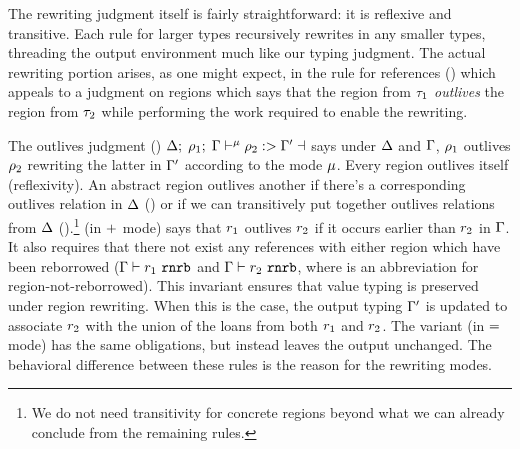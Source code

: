 The rewriting judgment itself is fairly straightforward: it is reflexive and
transitive. Each rule for larger types recursively rewrites in any smaller
types, threading the output environment much like our typing judgment. The
actual rewriting portion arises, as one might expect, in the rule for references
() which appeals to a judgment on regions which says that
the region from $\tau_1$ \emph{outlives} the region from $\tau_2$ while
performing the work required to enable the rewriting.

The outlives judgment ()
$\oxrunify{\oxtvarctx}{\oxvarctx}{\oxprov_1}{\oxprov_2}{\oxvarctx^\prime}$ says
under $\Delta$ and $\Gamma$, $\rho_1$ outlives $\rho_2$ rewriting
the latter in $\Gamma^\prime$ according to the mode $\mu$. Every
region outlives itself (reflexivity). An abstract region outlives another if
there's a corresponding outlives relation in $\Delta$
() or if we can transitively put together outlives
relations from $\Delta$ ().\footnote{We do not need
  transitivity for concrete regions beyond what we can already conclude from the
  remaining  rules.}  (in $+$
mode) says that $r_1$ outlives $r_2$ if it occurs earlier than
$r_2$ in $\Gamma$. It also requires that there not exist any
references with either region which have been reborrowed
($\Gamma \vdash r_1 \ \mathtt{rnrb}$ and
$\Gamma \vdash r_2 \ \mathtt{rnrb}$, where  is an abbreviation
for region-not-reborrowed). This invariant ensures that value typing is
preserved under region rewriting. When this is the case, the output typing
$\Gamma^\prime$ is updated to associate $r_2$ with the union of the
loans from both $r_1$ and $r_2$. The variant
 (in $=$ mode) has the same obligations, but
instead leaves the output unchanged. The behavioral difference between these
rules is the reason for the rewriting modes.

